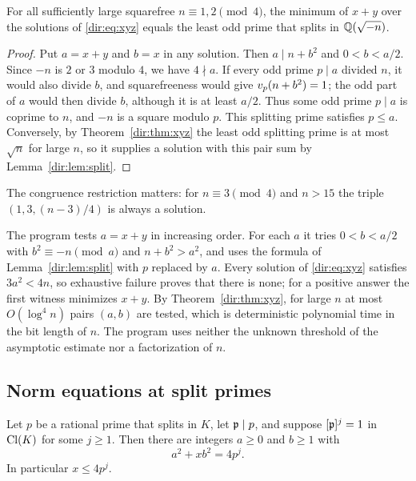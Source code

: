 \begin{proposition}
\label{dir:prop:xyzmin}
For all sufficiently large squarefree $n\equiv1,2\pmod4$, the minimum of $x+y$ over the
solutions of \eqref{dir:eq:xyz} equals the least odd prime that splits in
$\mathbb{Q}(\sqrt{-n})$.
\end{proposition}

\begin{proof}
Put $a=x+y$ and $b=x$ in any solution. Then $a\mid n+b^2$ and $0<b<a/2$. Since $-n$ is
$2$ or $3$ modulo $4$, we have $4\nmid a$. If every odd prime $p\mid a$ divided $n$, it
would also divide $b$, and squarefreeness would give $v_p(n+b^2)=1$; the odd part of
$a$ would then divide $b$, although it is at least $a/2$. Thus some odd prime $p\mid a$
is coprime to $n$, and $-n$ is a square modulo $p$. This splitting prime satisfies
$p\le a$. Conversely, by Theorem~\ref{dir:thm:xyz} the least odd splitting prime is at most
$\sqrt n$ for large $n$, so it supplies a solution with this pair sum by
Lemma~\ref{dir:lem:split}.
\end{proof}

The congruence restriction matters: for $n\equiv3\pmod4$ and $n>15$ the triple
$(1,3,(n-3)/4)$ is always a solution.

\begin{remark}\label{dir:rem:xyzalg}
The program  tests $a=x+y$ in increasing
order. For each $a$ it tries $0<b<a/2$ with $b^2\equiv-n\pmod a$ and $n+b^2>a^2$, and
uses the formula of Lemma~\ref{dir:lem:split} with $p$ replaced by $a$. Every solution of
\eqref{dir:eq:xyz} satisfies $3a^2<4n$, so exhaustive failure proves that there is
none; for a positive answer the first witness minimizes $x+y$. By Theorem~\ref{dir:thm:xyz},
for large $n$ at most $O(\log^4n)$ pairs $(a,b)$ are tested, which is deterministic
polynomial time in the bit length of $n$. The program uses neither the unknown
threshold of the asymptotic estimate nor a factorization of $n$.
\end{remark}

\subsection{Norm equations at split primes}\label{cls:sec:norm}

\begin{lemma}\label{cls:lem:norm}
Let $p$ be a rational prime that splits in $K$, let $\mathfrak p\mid p$, and suppose
$[\mathfrak p]^j=1$ in $\operatorname{Cl}(K)$ for some $j\ge1$. Then there are integers $a\ge0$ and $b\ge1$
with
\begin{equation}\label{cls:eq:norm}
  a^2+xb^2=4p^j .
\end{equation}
In particular $x\le4p^j$.
\end{lemma}

